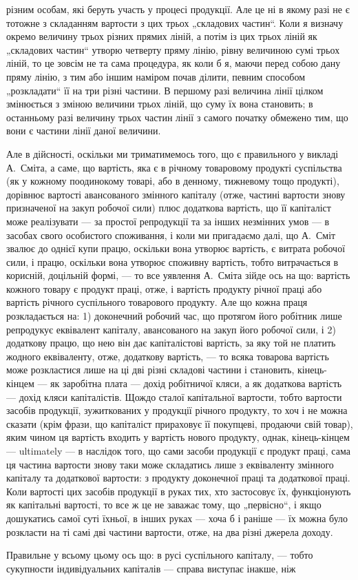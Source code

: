 \parcont{}  %
різним особам, які беруть участь у процесі продукції. Але це ні в якому
разі не є тотожне з складанням вартости з цих трьох „складових частин“.
Коли я визначу окремо величину трьох різних прямих ліній, а
потім із цих трьох ліній як „складових частин“ утворю четверту пряму
лінію, рівну величиною сумі трьох ліній, то це зовсім не та сама процедура,
як коли б я, маючи перед собою дану пряму лінію, з тим або
іншим наміром почав ділити, певним способом „розкладати“ її на три
різні частини. В першому разі величина лінії цілком змінюється з зміною
величини трьох ліній, що суму їх вона становить; в останньому разі
величину трьох частин лінії з самого початку обмежено тим, що вони
є частини лінії даної величини.

Але в дійсності, оскільки ми триматимемось того, що є правильного
у викладі А.~Сміта, а саме, що  вартість,
яка є в річному товаровому продукті суспільства (як у кожному поодинокому
товарі, або в денному, тижневому тощо продукті), дорівнює вартості
авансованого змінного капіталу (отже, частині вартости знову призначеної
на закуп робочої сили) плюс додаткова вартість, що її капіталіст може
реалізувати — за простої репродукції та за інших незмінних умов — в засобах
свого особистого споживання, і коли ми пригадаємо далі, що А.~Сміт звалює до однієї купи працю, оскільки вона утворює вартість, є
витрата робочої сили, і працю, оскільки вона утворює споживну вартість,
тобто витрачається в корисній, доцільній формі, — то все уявлення
А.~Сміта зійде ось на що: вартість кожного товару є продукт праці,
отже, і вартість продукту річної праці або вартість річного суспільного
товарового продукту. Але що кожна праця розкладається на: 1) доконечний
робочий час, що протягом його робітник лише репродукує еквівалент
капіталу, авансованого на закуп його робочої сили, і 2) додаткову працю,
що нею він дає капіталістові вартість, за яку той не платить жодного
еквіваленту, отже, додаткову вартість, — то всяка товарова вартість може
розкластися лише на ці дві різні складові частини і становить, кінець-кінцем —
як заробітна плата — дохід робітничої кляси, а як додаткова вартість —
дохід кляси капіталістів. Щождо сталої капітальної вартости, тобто вартости
засобів продукції, зужиткованих у продукції річного продукту, то
хоч і не можна сказати (крім фрази, що капіталіст прираховує її покупцеві,
продаючи свій товар), яким чином ця вартість входить у вартість
нового продукту, однак, кінець-кінцем — ultimately — в наслідок того, що
сами засоби продукції є продукт праці, сама ця частина вартости знову
таки може складатись лише з еквіваленту змінного капіталу та додаткової
вартости: з продукту доконечної праці та додаткової праці. Коли
вартості цих засобів продукції в руках тих, хто застосовує їх, функціонують
як капітальні вартості, то все ж це не заважає тому, що „первісно“,
і якщо дошукатись самої суті їхньої, в інших руках — хоча б і раніше — їх
можна було розкласти на ті самі дві частини вартости, отже, на два
різні джерела доходу.

Правильне у всьому цьому ось що: в русі суспільного капіталу, —
тобто сукупности індивідуальних капіталів — справа виступає інакше, ніж
\parbreak{}  %
